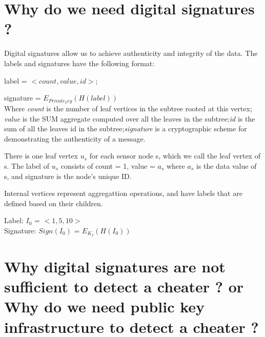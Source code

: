 	\section{ Why do we need digital signatures ?}
	Digital signatures allow us to achieve authenticity and integrity of the data. 
	The labels and signatures have the following format:

	label = $<count, value, id>$;

	signature = $E_{Private_key}( H( label ) )$\\
	Where \textit{count} is the number of leaf vertices in the subtree rooted at this vertex;	
	\textit{value} is the SUM aggregate computed over all the leaves in the subtree;\textit{id} is the sum of all the leaves id in the subtree;\textit{signature} is a cryptographic scheme for demonstrating the authenticity of a message. 
	
	There is one leaf vertex $u_{s}$ for each sensor node s, which we call the leaf vertex of s. The label of $u_{s}$ consists of count = 1, value = $a_{s}$ where $a_{s}$ is the data value of s, and signature is the node's unique ID.

	Internal vertices represent aggregattion operations, and have labels that are defined based on their children.

	Label: $I_{0}$ = $<1, 5, 10>$\\
	
	Signature: $Sign(I_{0})$ = $E_{K_{I}}(H(I_{0}))$

	\section{ Why digital signatures are not sufficient to detect a cheater ? or Why do we need public key infrastructure to detect a cheater ?}
